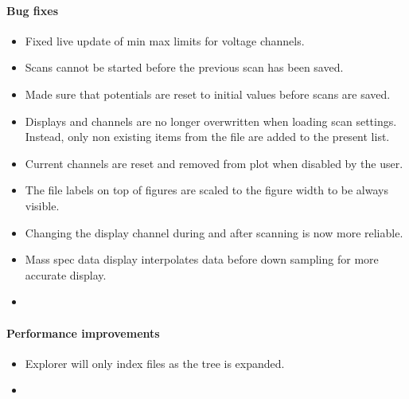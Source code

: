 \documentclass[a4paper,11pt,DIV=13]{scrartcl}
\begin{document}
\paragraph{Bug fixes}
\begin{itemize}
\item Fixed live update of min max limits for voltage channels.
\item Scans cannot be started before the previous scan has been saved.
\item Made sure that potentials are reset to initial values before scans are saved.
\item Displays and channels are no longer overwritten when loading scan settings. Instead, only non existing items from the file are added to the present list.
\item Current channels are reset and removed from plot when disabled by the user.
\item The file labels on top of figures are scaled to the figure width to be always visible.
\item Changing the display channel during and after scanning is now more reliable.
\item Mass spec data display interpolates data before down sampling for more accurate display.
\item 
\end{itemize}

\paragraph{Performance improvements}
\begin{itemize}
\item Explorer will only index files as the tree is expanded.
\item
\end{itemize}
\end{document}
